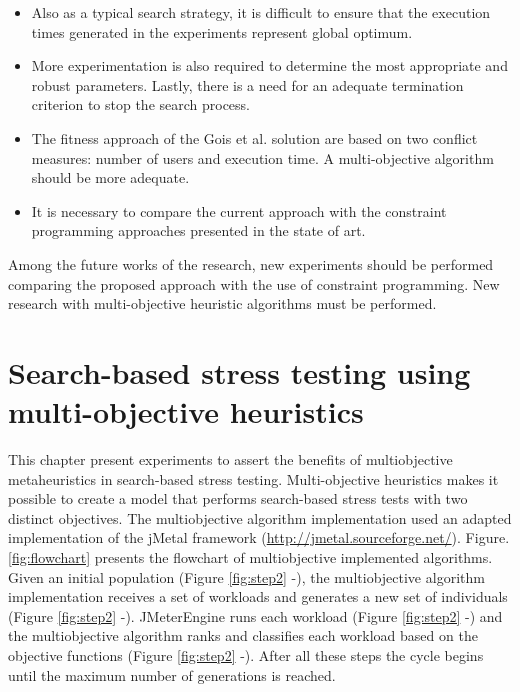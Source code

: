 \documentclass[espaco=umemeio,chapter=TITLE,twoside,openright]{abnt}
\begin{document}
\begin{itemize}
\item Also as a typical search strategy, it is difficult to ensure that the execution times generated in the experiments represent global optimum. 
\item More experimentation is also required to determine the most appropriate and robust parameters. Lastly, there is a need for an adequate termination criterion to stop the search process. 
\item The fitness approach of the Gois et al. solution are based on two conflict measures: number of users and execution time. A multi-objective algorithm should be more adequate. 
\item It is necessary to compare the current approach with the constraint programming approaches presented in the state of art.

\end{itemize}

Among the future works of the research, new experiments should be performed comparing the proposed approach with the use of constraint programming. New research with multi-objective heuristic algorithms must be performed.


\FloatBarrier

\chapter{Search-based stress testing using multi-objective heuristics}

This chapter present experiments to assert the benefits of multiobjective metaheuristics in search-based stress testing. Multi-objective heuristics makes it possible to create a model that performs search-based stress tests with  two distinct objectives. The multiobjective algorithm implementation used an adapted implementation of the jMetal framework (\url{http://jmetal.sourceforge.net/}). Figure. \ref{fig:flowchart} presents the flowchart of  multiobjective implemented algorithms. Given an initial population (Figure \ref{fig:step2}  -),  the multiobjective algorithm implementation receives a set of workloads  and generates a new set of individuals  (Figure \ref{fig:step2}  -).  JMeterEngine runs each workload (Figure \ref{fig:step2}  -) and the multiobjective algorithm ranks and classifies each workload based on the objective functions  (Figure \ref{fig:step2}  -).  After all these steps the cycle begins until the maximum number of generations is reached.
\end{document}
